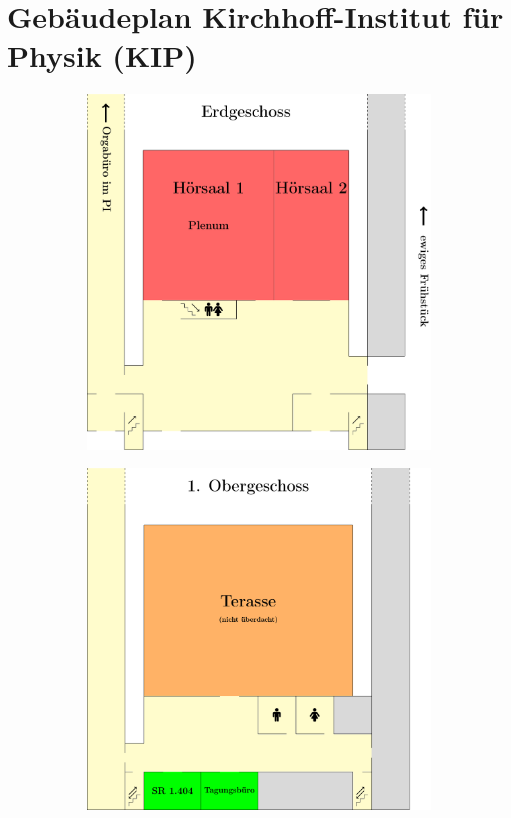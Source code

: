 \section{Gebäudeplan Kirchhoff-Institut für Physik (KIP)}
\begin{figure}[H]
\centering
\begin{subfigure}[h]{0.62\textwidth}
\centering
\includegraphics[width=\linewidth]{raumplan/eg}
\vspace*{5mm}
\end{subfigure}
\begin{subfigure}[h]{0.62\textwidth}
\centering
\includegraphics[width=\linewidth]{raumplan/og1}
\end{subfigure}
\end{figure}

